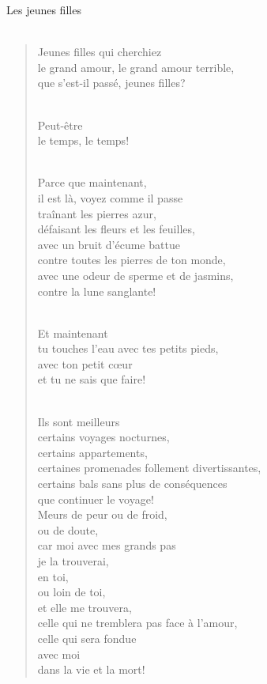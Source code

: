 \documentclass[11pt,a4paper]{book}
\begin{document}
\newpage

{\huge Les jeunes filles} \\ \\

\begin{verse}
Jeunes filles qui cherchiez \\
le grand amour, le grand amour terrible, \\
que s'est-il passé, jeunes filles? \\ \

Peut-être \\
le temps, le temps! \\ \

Parce que maintenant, \\
il est là, voyez comme il passe \\
traînant les pierres azur, \\
défaisant les fleurs et les feuilles, \\
avec un bruit d'écume battue \\
contre toutes les pierres de ton monde, \\
avec une odeur de sperme et de jasmins, \\
contre la lune sanglante! \\ \

Et maintenant \\
tu touches l'eau avec tes petits pieds, \\
avec ton petit c{\oe}ur \\
et tu ne sais que faire! \\ \

Ils sont meilleurs \\
certains voyages nocturnes, \\
certains appartements, \\
certaines promenades follement divertissantes, \\
certains bals sans plus de conséquences \\
que continuer le voyage! \\

Meurs de peur ou de froid, \\
ou de doute, \\
car moi avec mes grands pas \\
je la trouverai, \\
en toi, \\
ou loin de toi, \\
et elle me trouvera, \\
celle qui ne tremblera pas face à l'amour, \\
celle qui sera fondue \\
avec moi \\
dans la vie et la mort!
\end{verse}
\end{document}
